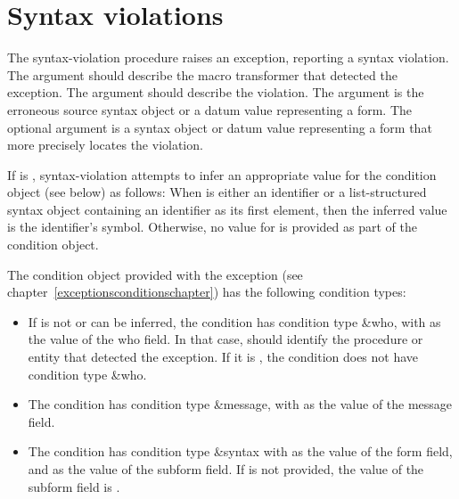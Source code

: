 \section{Syntax violations}

\begin{entry}{%
}

The {\cf syntax-violation} procedure raises an exception, reporting 
a syntax violation.  
The  argument should describe the macro transformer that
detected the exception.  The  argument should describe
the violation.
The  argument is the erroneous source syntax
object or a datum value representing a form. The optional  argument is a syntax
object or datum value representing a form that more precisely locates the
violation.

If  is \schfalse{}, {\cf syntax-violation} attempts to
infer an appropriate value for the condition object (see below) as
follows:  When  is either an identifier or a
list-structured syntax object containing an identifier as its first element, then
the inferred value is the identifier's symbol.
Otherwise, no value for  is provided as part of the
condition object.

The condition object provided with the exception (see
chapter~\ref{exceptionsconditionschapter}) has the following condition types:
%
\begin{itemize}
\item If  is not \schfalse{} or can be inferred, the condition has condition type
  {\cf \&who}, with  as the value of the {\cf who} field.  In
  that case,  should identify the procedure or entity that
  detected the exception.  If it is \schfalse, the condition does not
  have condition type {\cf \&who}.
\item The condition has condition type {\cf \&message}, with
   as the value of the {\cf message} field.
\item The condition has condition type {\cf \&syntax} 
  with  as the value of the {\cf form} field,
  and  as the value of the {\cf subform} field.
  If  is not provided, the value of the {\cf subform}
  field is \schfalse.
\end{itemize}
\end{entry}

